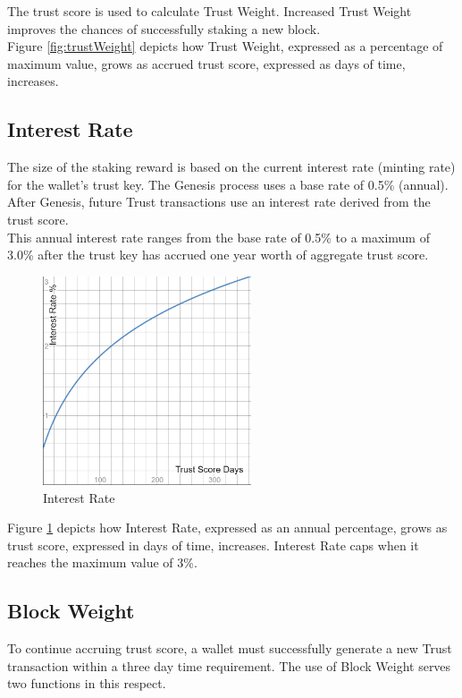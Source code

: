 \documentclass[11pt]{article}
\begin{document}
\noindent The trust score is used to calculate Trust Weight. Increased Trust Weight improves the chances of successfully staking a new block.\\

\noindent Figure \ref{fig:trustWeight} depicts how Trust Weight, expressed as a percentage of maximum value, grows as accrued trust score, expressed as days of time, increases.\\

\subsection{Interest Rate}
The size of the staking reward is based on the current interest rate (minting rate) for the wallet’s trust key. The Genesis process uses a base rate of 0.5\% (annual). After Genesis, future Trust transactions use an interest rate derived from the trust score.\\

\noindent This annual interest rate ranges from the base rate of 0.5\% to a maximum of 3.0\% after the trust key has accrued one year worth of aggregate trust score. \\

\begin{figure}[h!]
    \centering
    \includegraphics[width=0.55\textwidth]{images/interestRate.png}
    \caption{Interest Rate \label{fig:interestRate}}
\end{figure}

\noindent Figure \ref{fig:interestRate} depicts how Interest Rate, expressed as an annual percentage, grows as trust score, expressed in days of time, increases. Interest Rate caps when it reaches the maximum value of 3\%.\\

\subsection{Block Weight}
To continue accruing trust score, a wallet must successfully generate a new Trust transaction within a three day time requirement. The use of Block Weight serves two functions in this respect.\\
\end{document}
